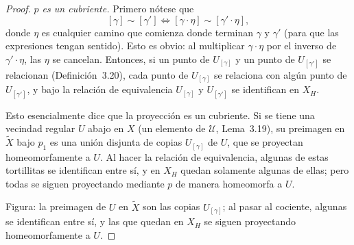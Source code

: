 \documentclass[11pt]{article}
\begin{document}
\begin{proof}
\medskip\noindent\emph{$p$ es un cubriente.} Primero nótese que
\[
  [\gamma]\sim[\gamma']\iff[\gamma\cdot\eta]\sim[\gamma'\cdot\eta],
\]
donde $\eta$ es cualquier camino que comienza donde terminan $\gamma$ y $\gamma'$ (para que las expresiones tengan sentido). Esto es obvio: al multiplicar $\gamma\cdot\eta$ por el inverso de $\gamma'\cdot\eta$, las $\eta$ se cancelan. Entonces, si un punto de $U_{[\gamma]}$ y un punto de $U_{[\gamma']}$ se relacionan (Definición~3.20), cada punto de $U_{[\gamma]}$ se relaciona con algún punto de $U_{[\gamma']}$, y bajo la relación de equivalencia $U_{[\gamma]}$ y $U_{[\gamma']}$ se identifican en $X_H$.

Esto esencialmente dice que la proyección es un cubriente. Si se tiene una vecindad regular $U$ abajo en $X$ (un elemento de $\mathcal U$, Lema~3.19), su preimagen en $\tilde X$ bajo $p_1$ es una unión disjunta de copias $U_{[\gamma]}$ de $U$, que se proyectan homeomorfamente a $U$. Al hacer la relación de equivalencia, algunas de estas tortillitas se identifican entre sí, y en $X_H$ quedan solamente algunas de ellas; pero todas se siguen proyectando mediante $p$ de manera homeomorfa a $U$.

\begin{center}
\end{center}

\noindent Figura: la preimagen de $U$ en $\tilde X$ son las copias $U_{[\gamma]}$; al pasar al cociente, algunas se identifican entre sí, y las que quedan en $X_H$ se siguen proyectando homeomorfamente a $U$.


\end{proof}
\end{document}
